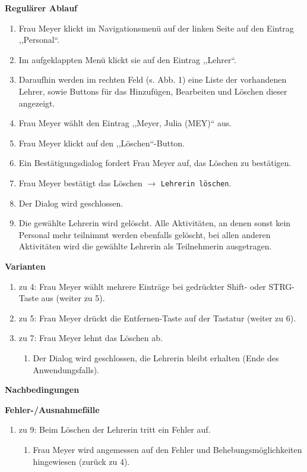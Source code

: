 \documentclass[fontsize=12pt,paper=a4,twoside]{scrartcl}
\begin{document}
\textbf{Regulärer Ablauf}
\begin{enumerate}
\item Frau Meyer klickt im Navigationsmenü auf der linken Seite auf den Eintrag ,,Personal``.
\item Im aufgeklappten Menü klickt sie auf den Eintrag ,,Lehrer``.
\item Daraufhin werden im rechten Feld (s. Abb. 1) eine Liste der vorhandenen Lehrer, sowie Buttons für das Hinzufügen, Bearbeiten und Löschen dieser angezeigt.
\item Frau Meyer wählt den Eintrag ,,Meyer, Julia (MEY)`` aus.
\item Frau Meyer klickt auf den ,,Löschen``-Button.
\item Ein Bestätigungsdialog fordert Frau Meyer auf, das Löschen zu bestätigen.
\item Frau Meyer bestätigt das Löschen $\rightarrow$ \texttt{Lehrerin löschen}.
\item Der Dialog wird geschlossen.
\item Die gewählte Lehrerin wird gelöscht. Alle Aktivitäten, an denen sonst kein Personal mehr teilnimmt werden ebenfalls gelöscht, bei allen anderen Aktivitäten wird die gewählte Lehrerin als Teilnehmerin ausgetragen.
\end{enumerate}
\vspace{5pt}

\textbf{Varianten}
\begin{enumerate}
\item zu 4: Frau Meyer wählt mehrere Einträge bei gedrückter Shift- oder STRG-Taste aus (weiter zu 5).
\item zu 5: Frau Meyer drückt die Entfernen-Taste auf der Tastatur (weiter zu 6).
\item zu 7: Frau Meyer lehnt das Löschen ab. 
	\begin{enumerate}[label=\arabic*.]
	\item Der Dialog wird geschlossen, die Lehrerin bleibt erhalten (Ende des Anwendungsfalls).
	\end{enumerate}
\end{enumerate}
\vspace{5pt}

\textbf{Nachbedingungen}
\vspace{5pt}

\textbf{Fehler-/Ausnahmefälle}
\begin{enumerate}
\item zu 9: Beim Löschen der Lehrerin tritt ein Fehler auf.
	\begin{enumerate}[label=\arabic*.]
	\item Frau Meyer wird angemessen auf den Fehler und Behebungsmöglichkeiten hingewiesen (zurück zu 4).
	\end{enumerate}
\end{enumerate}
\end{document}
